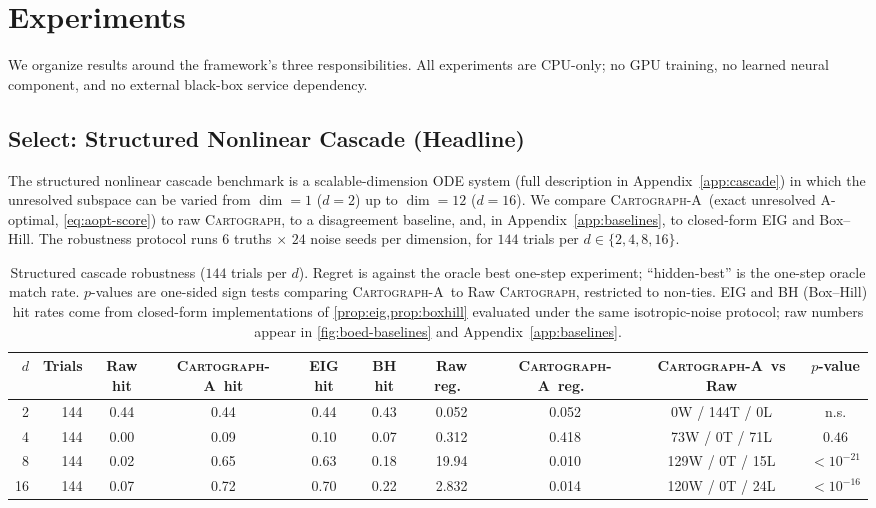 \documentclass{article}
\newcommand{\method}{\textsc{Cartograph}}
\newcommand{\uopt}{\textsc{Cartograph-A}}
\theoremstyle{plain}
\theoremstyle{definition}
\theoremstyle{remark}
\begin{document}
\section{Experiments}
\label{sec:exp}

We organize results around the framework's three responsibilities. All
experiments are CPU-only; no GPU training, no learned neural component, and
no external black-box service dependency.

\subsection{Select: Structured Nonlinear Cascade (Headline)}
\label{sec:cascade}

The structured nonlinear cascade benchmark is a scalable-dimension ODE
system (full description in Appendix~\ref{app:cascade}) in which the
unresolved subspace can be varied from $\dim\!=\!1$ ($d\!=\!2$) up to
$\dim\!=\!12$ ($d\!=\!16$). We compare \uopt\ (exact unresolved A-optimal,
\eqref{eq:aopt-score}) to raw \method, to a disagreement baseline, and, in
Appendix~\ref{app:baselines}, to closed-form EIG and Box--Hill. The
robustness protocol runs $6$ truths $\times$ $24$ noise seeds per
dimension, for $144$ trials per $d\in\{2,4,8,16\}$.

\begin{table}[t]
\caption{Structured cascade robustness ($144$ trials per $d$). Regret is
against the oracle best one-step experiment; ``hidden-best'' is the one-step
oracle match rate. $p$-values are one-sided sign tests comparing \uopt\ to
Raw \method, restricted to non-ties. EIG and BH (Box--Hill) hit rates come
from closed-form implementations of \cref{prop:eig,prop:boxhill} evaluated
under the same isotropic-noise protocol; raw numbers appear in
\cref{fig:boed-baselines} and Appendix~\ref{app:baselines}.}
\label{tab:cascade-robust}
\centering
\small
\begin{tabular}{r r c c c c c c c c}
\toprule
$d$ & Trials & Raw hit & \uopt\ hit & EIG hit & BH hit & Raw reg.\ & \uopt\ reg.\ & \uopt\ vs Raw & $p$-value \\
\midrule
2  & 144 & 0.44 & 0.44 & 0.44 & 0.43 & 0.052 & 0.052 & 0W / 144T / 0L & n.s.\\
4  & 144 & 0.00 & 0.09 & 0.10 & 0.07 & 0.312 & 0.418 & 73W / 0T / 71L & $0.46$ \\
8  & 144 & 0.02 & 0.65 & 0.63 & 0.18 & 19.94 & 0.010 & 129W / 0T / 15L & $<10^{-21}$ \\
16 & 144 & 0.07 & 0.72 & 0.70 & 0.22 & 2.832 & 0.014 & 120W / 0T / 24L & $<10^{-16}$ \\
\bottomrule
\end{tabular}
\end{table}
\end{document}
